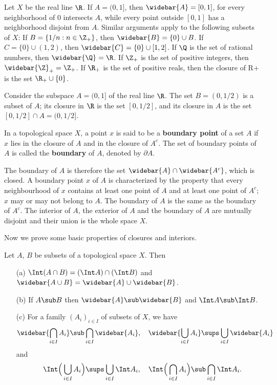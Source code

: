 \begin{example}
Let $X$ be the real line $\R$. If $A=(0,1]$, then $\widebar{A}=[0,1]$, for every neighborhood of $0$ intersects $A$, while every point outside $[0,1]$ has a neighborhood disjoint from $A$. Similar arguments apply to the following subsets of $X$: If $B=\{1/n:n\in\Z_+\}$, then $\widebar{B}=\{0\}\cup B$. If $C=\{0\}\cup(1,2)$, then $\widebar{C}=\{0\}\cup[1,2]$. If $\Q$ is the set of rational numbers, then $\widebar{\Q}=\R$. If $\Z_+$ is the set of positive integers, then $\widebar{\Z}_+=\Z_+$. If $\R_+$ is the set of positive reals, then the closure of R+ is the set $\R_+\cup\{0\}$.
\end{example}
\begin{example}
Consider the subspace $A=(0,1]$ of the real line $\R$. The set $B=(0,1/2)$ is a subset of $A$; its closure in $\R$ is the set $[0,1/2]$, and its closure in $A$ is the set $[0,1/2]\cap A=(0,1/2]$.
\end{example}
\begin{definition}
In a topological space $X$, a point $x$ is said to be a \textbf{boundary point} of a set $A$ if $x$ lies in the closure of $A$ and in the closure of $A^c$. The set of boundary points of $A$ is called the \textbf{boundary} of $A$, denoted by $\partial A$.
\end{definition}
The boundary of $A$ is therefore the set $\widebar{A}\cap\widebar{A^c}$, which is closed. A boundary point $x$ of $A$ is characterized by the property that every neighbourhood of $x$ contains at least one point of $A$ and at least one point of $A^c$; $x$ may or may not belong to $A$. The boundary of $A$ is the same as the boundary of $A^c$. The interior of $A$, the exterior of $A$ and the boundary of $A$ are mutually disjoint and their union is the whole space $X$.\par
Now we prove some basic properties of closures and interiors.
\begin{proposition}
Let $A$, $B$ be subsets of a topological space $X$. Then
\begin{itemize}
\item[(a)] $\Int(A\cap B)=(\Int A)\cap(\Int B)$ and $\widebar{A\cup B}=\widebar{A}\cup\widebar{B}$.
\item[(b)] If $A\sub B$ then $\widebar{A}\sub\widebar{B}$ and $\Int A\sub\Int B$.
\item[(c)] For a family $(A_i)_{i\in I}$ of subsets of $X$, we have
\[\widebar{\bigcap_{i\in I}A_i}\sub\bigcap_{i\in I}\widebar{A_i},\quad \widebar{\bigcup_{i\in I}A_i}\sups\bigcup_{i\in I}\widebar{A_i}\]
and
\[\quad\Int\Big(\bigcup_{i\in I}A_i\Big)\sups\bigcup_{i\in I}\Int A_i,\quad\Int\Big(\bigcap_{i\in I}A_i\Big)\sub\bigcap_{i\in I}\Int A_i.\] 
\end{itemize}
\end{proposition}
